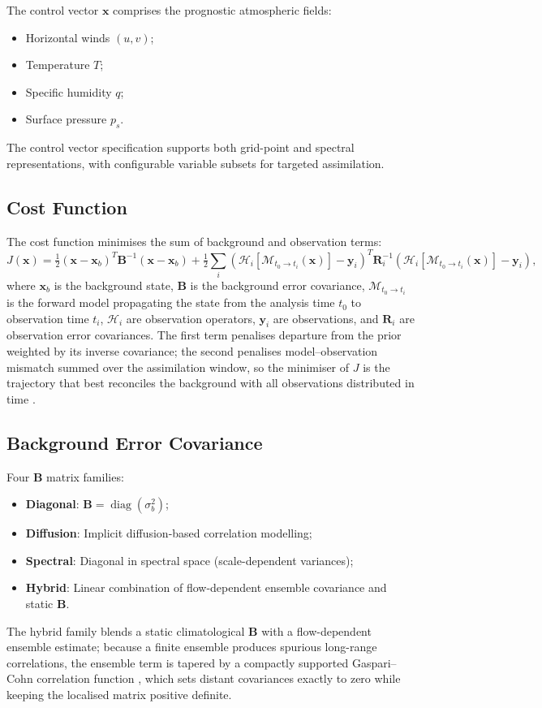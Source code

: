 \documentclass[11pt,twoside]{report}
\newcommand{\half}{\tfrac{1}{2}}
\newcommand{\vect}[1]{\bm{#1}}
\DeclareMathOperator{\diag}{diag}
\begin{document}
The control vector $\vect{x}$ comprises the prognostic atmospheric fields:
\begin{itemize}[nosep]
  \item Horizontal winds $(u, v)$;
  \item Temperature $T$;
  \item Specific humidity $q$;
  \item Surface pressure $p_s$.
\end{itemize}
The control vector specification supports both grid-point and spectral
representations, with configurable variable subsets for targeted assimilation.

\subsection{Cost Function}

The cost function minimises the sum of background and observation terms:
\begin{equation}
  J(\vect{x}) = \half(\vect{x}-\vect{x}_b)^T\mathbf{B}^{-1}(\vect{x}-\vect{x}_b)
  + \half\sum_i (\mathcal{H}_i[\mathcal{M}_{t_0\to t_i}(\vect{x})]-\vect{y}_i)^T
  \mathbf{R}_i^{-1}(\mathcal{H}_i[\mathcal{M}_{t_0\to t_i}(\vect{x})]-\vect{y}_i),
\end{equation}
where $\vect{x}_b$ is the background state, $\mathbf{B}$ is the background
error covariance, $\mathcal{M}_{t_0\to t_i}$ is the forward model propagating
the state from the analysis time $t_0$ to observation time $t_i$,
$\mathcal{H}_i$ are observation operators, $\vect{y}_i$ are observations, and
$\mathbf{R}_i$ are observation error covariances.  The first term penalises
departure from the prior weighted by its inverse covariance; the second
penalises model--observation mismatch summed over the assimilation window, so
the minimiser of $J$ is the trajectory that best reconciles the background with
all observations distributed in time \citep{Rabier2000}.

\subsection{Background Error Covariance}

Four $\mathbf{B}$ matrix families:
\begin{itemize}[nosep]
  \item \textbf{Diagonal}: $\mathbf{B}=\diag(\sigma_b^2)$;
  \item \textbf{Diffusion}: Implicit diffusion-based correlation modelling;
  \item \textbf{Spectral}: Diagonal in spectral space (scale-dependent variances);
  \item \textbf{Hybrid}: Linear combination of flow-dependent ensemble
    covariance and static $\mathbf{B}$.
\end{itemize}
The hybrid family blends a static climatological $\mathbf{B}$ with a
flow-dependent ensemble estimate; because a finite ensemble produces spurious
long-range correlations, the ensemble term is tapered by a compactly supported
Gaspari--Cohn correlation function \citep{GaspariCohn1999}, which sets distant
covariances exactly to zero while keeping the localised matrix positive
definite.
\end{document}
